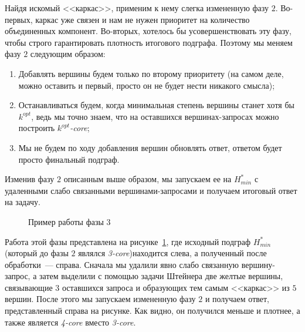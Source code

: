 Найдя искомый <<каркас>>, применим к нему слегка измененную фазу $2$. Во-первых, каркас уже связен и нам не нужен приоритет на количество объединенных компонент. Во-вторых, хотелось бы усовершенствовать эту фазу, чтобы строго гарантировать плотность итогового подграфа. Поэтому мы меняем фазу $2$ следующим образом:

\begin{enumerate}
  \item Добавлять вершины будем только по второму приоритету (на самом деле, можно оставить и первый, просто он не будет нести никакого смысла);
  \item Останавливаться будем, когда минимальная степень вершины станет хотя бы $k^{opt}$, ведь мы точно знаем, что на оставшихся вершинах-запросах можно построить \textit{$k^{opt}$-core};
  \item Мы не будем по ходу добавления вершин обновлять ответ, ответом будет просто финальный подграф.
\end{enumerate}

Изменив фазу $2$ описанным выше образом, мы запускаем ее на $H_{min}^*$ с удаленными слабо связанными вершинами-запросами и получаем итоговый ответ на задачу.

\begin{figure}[!h]
\caption{Пример работы фазы $3$}\label{phase3-example}
\centering
  \begin{center}
  \end{center}
\end{figure}

Работа этой фазы представлена на рисунке~\ref{phase3-example}, где исходный подграф $H_{min}^*$ (который до фазы $2$ являлся \textit{3-core})находится слева, а полученный после обработки~--- справа. Сначала мы удалили явно слабо связанную вершину-запрос, а затем выделили с помощью задачи Штейнера две желтые вершины, связывающие $3$ оставшихся запроса и образующих тем самым <<каркас>> из $5$ вершин. После этого мы запускаем измененную фазу $2$ и получаем ответ, представленный справа на рисунке. Как видно, он получился меньше и плотнее, а также является \textit{4-core} вместо \textit{3-core}.

